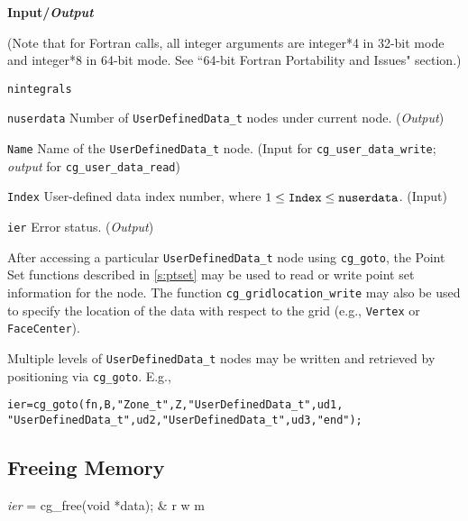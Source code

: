 \noindent
\textbf{\textcolor{input}{Input}/\textcolor{output}{\textit{Output}}}

\noindent (Note that for Fortran calls, all integer arguments are integer*4 in 32-bit mode and integer*8 in 64-bit mode.
See ``64-bit Fortran Portability and Issues" section.)

\begin{Ventryi}{\texttt{nintegrals}}\raggedright
\item [\texttt{nuserdata}]
      Number of \texttt{UserDefinedData\_t} nodes under current node.
      (\textcolor{output}{\textit{Output}})
\item [\texttt{Name}]
      Name of the \texttt{UserDefinedData\_t} node.
      (\textcolor{input}{Input} for \texttt{cg\_user\_data\_write};
      \textcolor{output}{\textit{output}} for \texttt{cg\_user\_data\_read})
\item [\texttt{Index}]
      User-defined data index number, where $1 \leq \text{\texttt{Index}} \leq \text{\texttt{nuserdata}}$.
      (\textcolor{input}{Input})
\item [\texttt{ier}]
      Error status.
      (\textcolor{output}{\textit{Output}})
\end{Ventryi}

After accessing a particular \texttt{UserDefinedData\_t} node using
\texttt{cg\_goto}, the Point Set functions described in \autoref{s:ptset}
may be used to read or write point set information for the node.
The function \texttt{cg\_gridlocation\_write} may also be used to specify
the location of the data with respect to the grid (e.g., \texttt{Vertex}
or \texttt{FaceCenter}).

Multiple levels of \texttt{UserDefinedData\_t} nodes may be written and
retrieved by positioning via \texttt{cg\_goto}.
E.g.,
\begin{alltt}
   ier = cg\_goto(fn, B, "Zone\_t", Z, "UserDefinedData\_t", ud1, 
                 "UserDefinedData\_t", ud2, "UserDefinedData\_t", ud3, "end");
\end{alltt}

\subsection{Freeing Memory}
\label{s:free}

\begin{fctbox}
\textcolor{output}{\textit{ier}} = cg\_free(\textcolor{input}{void *data}); & r w m \\
\end{fctbox}

